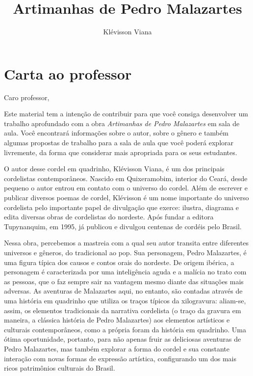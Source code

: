 \documentclass[11pt]{extarticle}
\newcommand{\AutorLivro}{Klévisson Viana}
\newcommand{\TituloLivro}{Artimanhas de Pedro Malazartes}
\newcommand{\colaborador}{Paulo Pompermaier}
\begin{document}
\title{\TituloLivro}
\author{\AutorLivro}
\def\authornotes{\colaborador}

\date{}
\maketitle

\tableofcontents

\section{Carta ao professor}

Caro professor,

Este material tem a intenção de contribuir para que você consiga desenvolver um trabalho aprofundado com a obra \textit{Artimanhas de Pedro Malazartes} em sala de aula.
Você encontrará informações sobre o autor, sobre o gênero e também 
algumas propostas de trabalho para a sala de aula que você poderá explorar livremente, 
da forma que considerar mais apropriada para os seus estudantes.

O autor desse cordel em quadrinho, Klévisson Viana, é um dos principais cordelistas contemporâneos.
Nascido em Quixeramobim, interior do Ceará, desde pequeno o autor entrou em contato com o universo do cordel.
Além de escrever e publicar diversos poemas de cordel, Klévisson é um nome importante do universo cordelista pelo importante papel de divulgação que exerce: ilustra, diagrama e edita diversas obras de cordelistas do nordeste. 
Após fundar a editora Tupynanquim, em 1995, já publicou e divulgou centenas de cordéis pelo Brasil.

Nessa obra, percebemos a mastreia com a qual seu autor transita entre diferentes universos e gêneros, do tradicional ao pop. Sua personagem, Pedro Malazartes, é uma figura típica dos causos e contos orais do nordeste. De origem ibérica, a personagem é caracterizada por uma inteligência aguda e a malícia no trato com as pessoas, que o faz sempre sair na vantagem mesmo diante das situações mais adversas. As aventuras de Malazartes aqui, no entanto, são contadas através de uma história em quadrinho que utiliza os traços típicos da xilogravura: aliam-se, assim, os elementos tradicionais da narrativa cordelista (o traço da gravura em maneira, a clássica história de Pedro Malazartes) aos elementos artísticos e culturais contemporâneos, como a própria foram da história em quadrinho. Uma ótima oportunidade, portanto, para não apenas fruir as deliciosas aventuras de Pedro Malazartes, mas também explorar a forma do cordel e sua constante interação com novas formas de expressão artística, configurando um dos mais ricos patrimônios culturais do Brasil.
\end{document}
